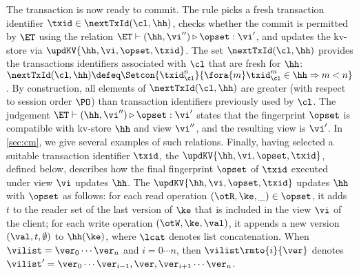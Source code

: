 The transaction is now ready to commit. The rule picks a fresh transaction identifier $\txid \in \nextTxId(\cl, \hh)$, 
checks whether the commit is permitted by $\ET$ using the relation $\ET \vdash (\hh, \vi'') \triangleright \opset : \vi'$, 
and updates the kv-store via $\updKV{\hh, \vi, \opset, \txid}$. 
The set $\nextTxId(\cl, \hh)$ provides the transactions identifiers
associated with $\cl$ that are fresh for  $\hh$:
$
\nextTxId(\cl, \hh) \defeq \Setcon{\txid_{\cl}^{n}}{\fora{m}
  \txid_{\cl}^{m} \in \hh \Rightarrow m < n }
$.
By construction, all elements of $\nextTxId(\cl, \hh)$ are greater (with respect to session order $\PO$) 
than transaction identifiers previously used by $\cl$. 
The judgement $\ET \vdash (\hh, \vi'') \triangleright \opset : \vi'$
states that the fingerprint $\opset$ is compatible with kv-store $\hh$
and view $\vi''$, and the resulting view is $\vi'$. 
In \cref{sec:cm}, we give several examples of such relations.
%
%
%
%
Finally, having selected a suitable transaction identifier $\txid$,
the $\updKV{\hh, \vi, \opset, \txid}$, defined below, describes how the final fingerprint $\opset$ of $\txid$ executed 
under view $\vi$ updates $\hh$. 
The $\updKV{\hh, \vi, \opset, \txid}$ updates $\hh$ with $\opset$ as follows: 
for each read operation $(\otR, \ke, \_) \in \opset$, it adds $t$ 
to the reader set of the last version of $\ke$ that is included in the view $\vi$ of the client; 
for each write operation $(\otW, \ke, \val)$, it appends a new version $(\val, t, \emptyset)$ 
to $\hh(\ke)$, where $\lcat$ denotes list concatenation.
When $\vilist = \ver_0 \cdots \ver_n$ and $i=0 \cdots n$, 
then $\vilist\rmto{i}{\ver}$ denotes 
$\vilist' = \ver_0 \cdots \ver_{i-1}, \ver, \ver_{i+1} \cdots \ver_{n}$. 

